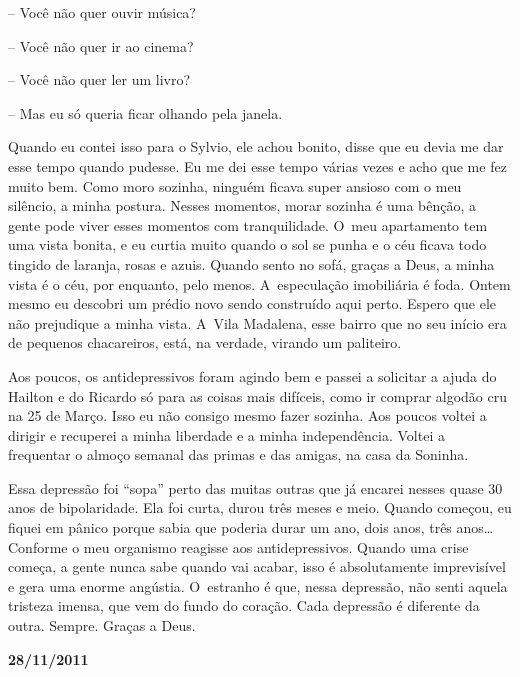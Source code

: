 -- Você não quer ouvir música?

-- Você não quer ir ao cinema?

-- Você não quer ler um livro?

-- Mas eu só queria ficar olhando pela janela.

Quando eu contei isso para o Sylvio, ele achou bonito, disse que eu
devia me dar esse tempo quando pudesse. Eu me dei esse tempo várias
vezes e acho que me fez muito bem. Como moro sozinha, ninguém ficava
super ansioso com o meu silêncio, a minha postura. Nesses momentos,
morar sozinha é uma bênção, a gente pode viver esses momentos com
tranquilidade. O~meu apartamento tem uma vista bonita, e eu curtia muito
quando o sol se punha e o céu ficava todo tingido de laranja, rosas e
azuis. Quando sento no sofá, graças a Deus, a minha vista é o céu, por
enquanto, pelo menos. A~especulação imobiliária é foda. Ontem mesmo eu
descobri um prédio novo sendo construído aqui perto. Espero que ele não
prejudique a minha vista. A~Vila Madalena, esse bairro que no seu início
era de pequenos chacareiros, está, na verdade, virando um paliteiro.

Aos poucos, os antidepressivos foram agindo bem e passei a solicitar a
ajuda do Hailton e do Ricardo só para as coisas mais difíceis, como ir
comprar algodão cru na 25 de Março. Isso eu não consigo mesmo fazer
sozinha. Aos poucos voltei a dirigir e recuperei a minha liberdade e a
minha independência. Voltei a frequentar o almoço semanal das primas e
das amigas, na casa da Soninha.

Essa depressão foi ``sopa'' perto das muitas outras que já encarei
nesses quase 30 anos de bipolaridade. Ela foi curta, durou três meses e
meio. Quando começou, eu fiquei em pânico porque sabia que poderia durar
um ano, dois anos, três anos… Conforme o meu organismo reagisse
aos antidepressivos. Quando uma crise começa, a gente nunca sabe quando
vai acabar, isso é absolutamente imprevisível e gera uma enorme
angústia. O~estranho é que, nessa depressão, não senti aquela tristeza
imensa, que vem do fundo do coração. Cada depressão é diferente da
outra. Sempre. Graças a Deus.

\begin{center}\asterisc{}\end{center}


\textbf{}

\begin{flushright}\textbf{28/11/2011}\end{flushright}


